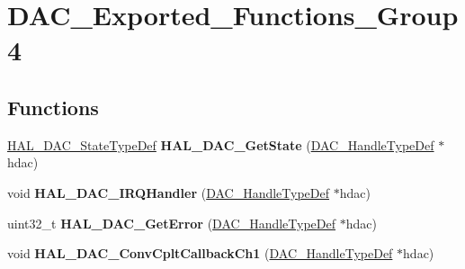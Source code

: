 \hypertarget{group___d_a_c___exported___functions___group4}{}\section{D\+A\+C\+\_\+\+Exported\+\_\+\+Functions\+\_\+\+Group4}
\label{group___d_a_c___exported___functions___group4}
\subsection*{Functions}
\begin{DoxyCompactItemize}
\item 
\mbox{\label{group___d_a_c___exported___functions___group4_ga2b7002cf7396d79d7bcba0f0243dfec6}} 
\mbox{\hyperlink{group___d_a_c___exported___types_ga4e917340aba1cc3afd4e9a7fef15e4a5}{H\+A\+L\+\_\+\+D\+A\+C\+\_\+\+State\+Type\+Def}} {\bfseries H\+A\+L\+\_\+\+D\+A\+C\+\_\+\+Get\+State} (\mbox{\hyperlink{struct_d_a_c___handle_type_def}{D\+A\+C\+\_\+\+Handle\+Type\+Def}} $\ast$hdac)
\item 
\mbox{\label{group___d_a_c___exported___functions___group4_gace33df9eb40ac0447bc16bd8baa95db4}} 
void {\bfseries H\+A\+L\+\_\+\+D\+A\+C\+\_\+\+I\+R\+Q\+Handler} (\mbox{\hyperlink{struct_d_a_c___handle_type_def}{D\+A\+C\+\_\+\+Handle\+Type\+Def}} $\ast$hdac)
\item 
\mbox{\label{group___d_a_c___exported___functions___group4_gac1b4903d6e80c1c0ec48c8fabaf968c2}} 
uint32\+\_\+t {\bfseries H\+A\+L\+\_\+\+D\+A\+C\+\_\+\+Get\+Error} (\mbox{\hyperlink{struct_d_a_c___handle_type_def}{D\+A\+C\+\_\+\+Handle\+Type\+Def}} $\ast$hdac)
\item 
\mbox{\label{group___d_a_c___exported___functions___group4_ga4c31d3d27f982c04b9a2a59973b35d23}} 
void {\bfseries H\+A\+L\+\_\+\+D\+A\+C\+\_\+\+Conv\+Cplt\+Callback\+Ch1} (\mbox{\hyperlink{struct_d_a_c___handle_type_def}{D\+A\+C\+\_\+\+Handle\+Type\+Def}} $\ast$hdac)
\item 
\mbox{\label{group___d_a_c___exported___functions___group4_ga60555b471a64d0a7f9603ca4ee23520d}} 

\end{DoxyCompactItemize}
